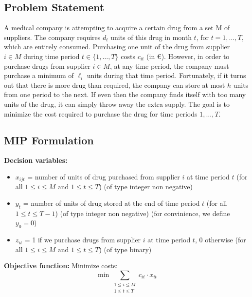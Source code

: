 \documentclass[a4paper,10pt]{article}
\begin{document}
\subsection*{Problem Statement}
A medical company is attempting to acquire a certain drug from a set M of suppliers. The company requires $d_t$ units of this drug in month $t$, for $t = 1, \ldots, T$, which are entirely consumed. Purchasing one unit of the drug from supplier $i \in M$ during time period $t \in \{1, \ldots, T\}$ costs $c_{it}$ (in \euro). However, in order to purchase drugs from supplier $i \in M$, at any time period, the company must purchase a minimum of $\ell_i$ units during that time period. Fortunately, if it turns out that there is more drug than required, the company can store at most $h$ units from one period to the next. If even then the company finds itself with too many units of the drug, it can simply throw away the extra supply. The goal is to minimize the cost required to purchase the drug for time periods $1, \ldots, T$.

\subsection*{MIP Formulation}

\textbf{Decision variables:}
\begin{itemize}
  \item \(x_{ijt}\) = number of units of drug purchased from supplier \(i\) at time period \(t\) (for all \(1 \leq i \leq M \text{ and }  1 \leq t \leq T\)) (of type integer non negative)
  \item \(y_t\) = number of units of drug stored at the end of time period \(t\) (for all \(1 \leq t \leq T-1\)) (of type integer non negative) (for convinience, we define \(y_0 = 0\)) 
  \item \(z_{it}\) = 1 if we purchase drugs from supplier \(i\) at time period \(t\), 0 otherwise (for all \(1 \leq i \leq M \text{ and }  1 \leq t \leq T\)) (of type binary) 
\end{itemize}

\textbf{Objective function:} 
Minimize costs: 
\[
  \min \sum_{\substack{1 \leq i \leq M \\ 1 \leq t \leq T}} c_{it} \cdot x_{it}
\]
\end{document}
